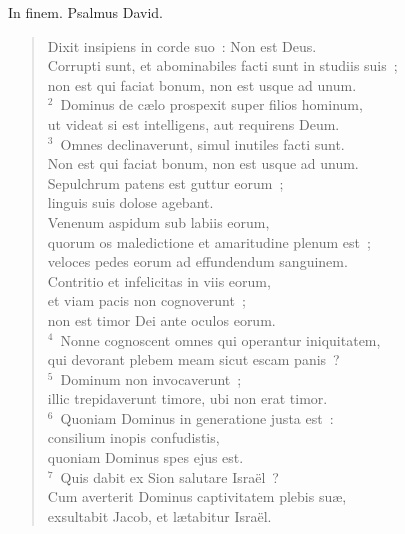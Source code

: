 \bchapter
\lettrine[lines=3,image=true,loversize=0.05,lraise=-0.03]{I}{}n finem. Psalmus David. \begin{flushleft}\begin{verse}\vspace{6pt}Dixit insipiens in corde suo~: Non est Deus.\\ Corrupti sunt, et abominabiles facti sunt in studiis suis~;\\ non est qui faciat bonum, non est usque ad unum.\\
${}^{2}$~Dominus de c\ae lo prospexit super filios hominum,\\ ut videat si est intelligens, aut requirens Deum.\\
${}^{3}$~Omnes declinaverunt, simul inutiles facti sunt.\\ Non est qui faciat bonum, non est usque ad unum.\\ Sepulchrum patens est guttur eorum~;\\ linguis suis dolose agebant.\\ Venenum aspidum sub labiis eorum,\\ quorum os maledictione et amaritudine plenum est~;\\ veloces pedes eorum ad effundendum sanguinem.\\ Contritio et infelicitas in viis eorum,\\ et viam pacis non cognoverunt~;\\ non est timor Dei ante oculos eorum.\\
${}^{4}$~Nonne cognoscent omnes qui operantur iniquitatem,\\ qui devorant plebem meam sicut escam panis~?\\
${}^{5}$~Dominum non invocaverunt~;\\ illic trepidaverunt timore, ubi non erat timor.\\
${}^{6}$~Quoniam Dominus in generatione justa est~:\\ consilium inopis confudistis,\\ quoniam Dominus spes ejus est.\\
${}^{7}$~Quis dabit ex Sion salutare Isra\"el~?\\ Cum averterit Dominus captivitatem plebis su\ae ,\\ exsultabit Jacob, et l\ae tabitur Isra\"el.\end{verse}\end{flushleft}



